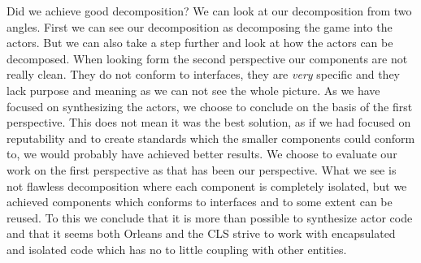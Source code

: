 Did we achieve good decomposition? We can look at our decomposition from two angles. First we can see our decomposition as decomposing the game into the actors. But we can also take a step further and look at how the actors can be decomposed. When looking form the second perspective our components are not really clean. They do not conform to interfaces, they are \textit{very} specific and they lack purpose and meaning as we can not see the whole picture. As we have focused on synthesizing the actors, we choose to conclude on the basis of the first perspective. This does not mean it was the best solution, as if we had focused on reputability and to create standards which the smaller components could conform to, we would probably have achieved better results. We choose to evaluate our work on the first perspective as that has been our perspective. What we see is not flawless decomposition where each component is completely isolated, but we achieved components which conforms to interfaces and to some extent can be reused. To this we conclude that it is more than possible to synthesize actor code and that it seems both Orleans and the CLS strive to work with encapsulated and isolated code which has no to little coupling with other entities.

